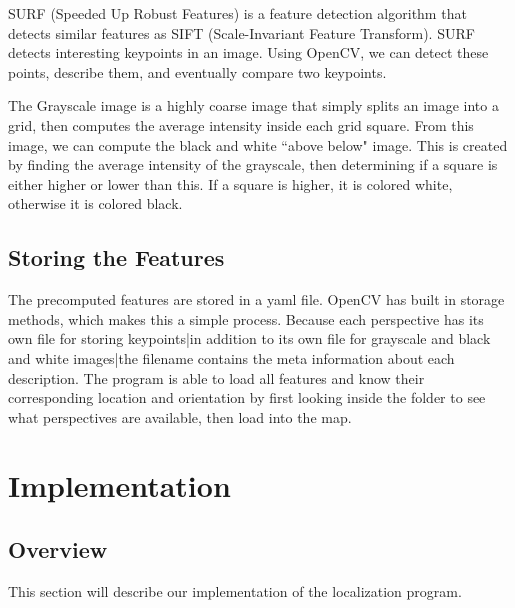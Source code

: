 \documentclass[a4paper,11pt]{article}
\begin{document}
SURF (Speeded Up Robust Features) is a feature detection algorithm that detects similar features as SIFT (Scale-Invariant Feature Transform). SURF detects interesting keypoints in an image. Using OpenCV, we can detect these points, describe them, and eventually compare two keypoints.

The Grayscale image is a highly coarse image that simply splits an image into a grid, then computes the average intensity inside each grid square. From this image, we can compute the black and white ``above below" image. This is created by finding the average intensity of the grayscale, then determining if a square is either higher or lower than this. If a square is higher, it is colored white, otherwise it is colored black.

  \subsection{Storing the Features}
The precomputed features are stored in a yaml file. OpenCV has built in storage methods, which makes this a simple process. Because each perspective has its own file for storing keypoints|in addition to its own file for grayscale and black and white images|the filename contains the meta information about each description. The program is able to load all features and know their corresponding location and orientation by first looking inside the folder to see what perspectives are available, then load into the map.

\newpage
  \section{Implementation}

 \subsection{Overview}
 This section will describe our implementation of the localization program. 
   
\end{document}
